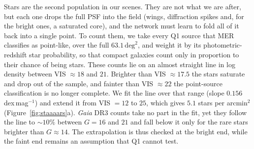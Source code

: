 

Stars are the second population in our scenes.
They are not what we are after, but each one drops the full PSF into the field (wings, diffraction spikes and, for the bright ones, a saturated core), and the network must learn to fold all of it back into a single point.
To count them, we take every Q1 source that MER classifies as point-like, over the full $63.1\,\mathrm{deg}^2$, and weight it by its photometric-redshift star probability, so that compact galaxies count only in proportion to their chance of being stars.
These counts lie on an almost straight line in log density between VIS $\approx18$ and $21$.
Brighter than VIS $\approx17.5$ the stars saturate and drop out of the sample, and fainter than VIS $\approx22$ the point-source classification is no longer complete.
We fit the line over that range (slope $0.156$\,dex\,mag$^{-1}$) and extend it from VIS $=12$ to $25$, which gives $5.1$ stars per arcmin$^2$ (Figure~\ref{fig:staaaars}a).
\textit{Gaia} DR3 counts take no part in the fit, yet they follow the line to $\sim\!10\%$ between $G=16$ and $21$ and fall below it only for the rare stars brighter than $G\approx14$.
The extrapolation is thus checked at the bright end, while the faint end remains an assumption that Q1 cannot test.

